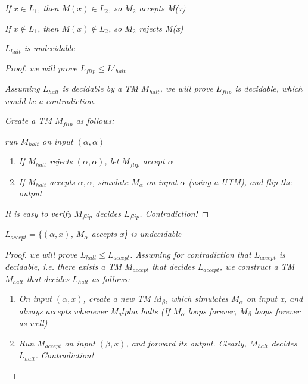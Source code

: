 \documentclass{article}
\begin{document}
\textit{If $x\in L_1$, then $M(x)\in L_2$, so $M_2$ accepts M(x)}

\textit{If $x\notin L_1$, then $M(x)\notin L_2$, so $M_2$ rejects M(x)}

\begin{thm}
    \textit{$L_{halt}$ is undecidable}

    \begin{proof}
        \textit{we will prove $L_{flip}\leq L'_{halt}$}

        \textit{Assuming $L_{halt}$ is decidable by a TM $M_{halt}$, we will prove $L_{flip}$ is decidable, which would be a contradiction.}
        
        \textit{Create a TM $M_{flip}$ as follows:}

        \textit{run $M_{halt}$ on input $(\alpha,\alpha)$}

        \begin{enumerate}
            \item \textit{If $M_{halt}$ rejects $(\alpha,\alpha)$, let $M_{flip}$ accept $\alpha$}
            \item \textit{If $M_{halt}$ accepts $\alpha,\alpha$, simulate $M_\alpha$ on input $\alpha$ (using a UTM), and flip the output}
        \end{enumerate}

        \textit{It is easy to verify $M_{flip}$ decides $L_{flip}$. Contradiction!}
    \end{proof}
\end{thm}

\begin{lemma}
    \textit{$L_{accept} = \{(\alpha,x)$, $M_\alpha$ accepts x\} is undecidable}

    \begin{proof}
        \textit{we will prove $L_{halt}\leq L_{accept}$. Assuming for contradiction that $L_{accept}$ is decidable, i.e. there exists a TM $M_{accept}$ that decides $L_{accept}$, we construct a TM $M_{halt}$ that decides $L_{halt}$ as follows:}
        \begin{enumerate}
            \item \textit{On input $(\alpha,x)$, create a new TM $M_\beta$, which simulates $M_\alpha$ on input x, and always accepts whenever $M_alpha$ halts (If $M_\alpha$ loops forever, $M_\beta$ loops forever as well)}
            \item \textit{Run $M_{accept}$ on input $(\beta,x)$, and forward its output. Clearly, $M_{halt}$ decides $L_{halt}$. Contradiction!} 
        \end{enumerate}
    \end{proof}
\end{lemma}
\end{document}
